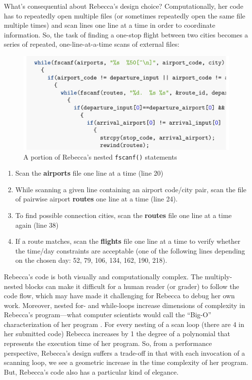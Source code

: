 What's consequential about Rebecca's design choice? Computationally, her code has to repeatedly open multiple files (or sometimes repeatedly open the same file multiple times) and scan lines one line at a time in order to coordinate information. So, the task of finding a one-stop flight between two cities becomes a series of repeated, one-line-at-a-time scans of external files:

\begin{figure}[htbp]
\centering
\includegraphics{media/fscanf.pdf}
\caption{A portion of Rebecca's nested \texttt{fscanf()} statements}
\end{figure}

\begin{enumerate}
\def\labelenumi{\arabic{enumi}.}
\tightlist
\item
  Scan the \textbf{airports} file one line at a time (line 20)
\item
  While scanning a given line containing an airport code/city pair, scan the file of pairwise airport \textbf{routes} one line at a time (line 24).
\item
  To find possible connection cities, scan the \textbf{routes} file one line at a time again (line 38)
\item
  If a route matches, scan the \textbf{flights} file one line at a time to verify whether the time/day constraints are acceptable (one of the following lines depending on the chosen day: 52, 79, 106, 134, 162, 190, 218).
\end{enumerate}

Rebecca's code is both visually and computationally complex. The multiply-nested blocks can make it difficult for a human reader (or grader) to follow the code flow, which may have made it challenging for Rebecca to debug her own work. Moreover, nested for- and while-loops increase dimensions of complexity in Rebecca's program---what computer scientists would call the ``Big-O'' characterization of her program \citep{cormen_introduction_1990}. For every nesting of a scan loop (there are 4 in her submitted code) Rebecca increases by 1 the degree of a polynomial that represents the execution time of her program. So, from a performance perspective, Rebecca's design suffers a trade-off in that with each invocation of a scanning loop, we see a geometric increase in the time complexity of her program. But, Rebecca's code also has a particular kind of elegance.

